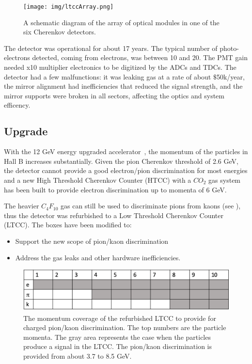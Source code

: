 \begin{figure}[ht]
	\centering
	\texttt{[image: img/ltccArray.png]}
	\caption{A schematic diagram of the array of optical modules in one of the six Cherenkov detectors.}
	\label{fig:ltccArray}
\end{figure}

The detector was operational for about 17 years. The typical number of photo-electrons detected, coming from electrons, was between 10 and 20.
The PMT gain needed x10 multiplier electronics to be digitized by the ADCs and TDCs.
The detector had a few malfunctions: it was leaking gas at a rate of about $\$$50k/year, the mirror alignment had inefficiencies that reduced
the signal strength, and the mirror supports were broken in all sectors, affecting the optics and system efficency.


\subsection{Upgrade}

With the 12 GeV energy upgraded accelerator~\cite{TDR12}, the momentum of the particles in Hall B increases substantially.
Given the pion Cherenkov threshold of 2.6 GeV, the detector cannot provide a good electron/pion discrimination for most energies and a new
High Threshold Cherenkov Counter (HTCC) with a $CO_2$ gas system has been built to provide electron discrimination up to momenta of 6 GeV.

The heavier $C_4F_{10}$ gas can still be used to discriminate pions from kaons (see ), thus the detector was refurbished
to a Low Threshold Cherenkov Counter (LTCC).
The boxes have been modified to:

\begin{itemize}
	\item Support the new scope of pion/kaon discrimination
	\item Address the gas leaks and other hardware inefficiencies.
\end{itemize}

\begin{figure}[hb]
	\centering
	\includegraphics[width=0.95\columnwidth,keepaspectratio]{img/newScope.png}
	\caption{The momentum coverage of the refurbished LTCC to provide for charged pion/kaon discrimination.
             The top numbers are the particle momenta.
		     The gray area represents the case when the particles produce a signal in the LTCC.
			 The pion/kaon discrimination is provided from about 3.7 to 8.5 GeV.}
	\label{fig:newScope}
\end{figure}
